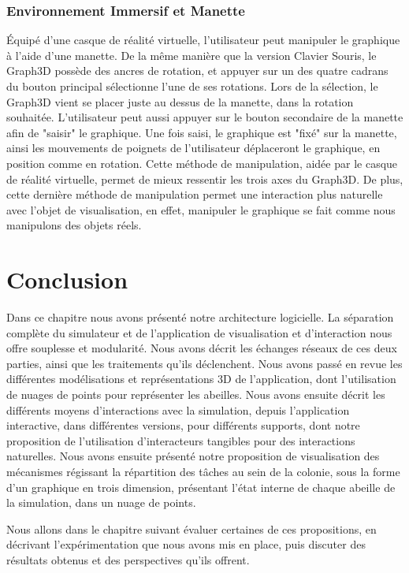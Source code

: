 		\subsubsection{Environnement Immersif et Manette}
		Équipé d'une casque de réalité virtuelle, l'utilisateur peut manipuler le graphique à l'aide d'une manette. De la même manière que la version Clavier Souris, le Graph3D possède des ancres de rotation, et appuyer sur un des quatre cadrans du bouton principal sélectionne l'une de ses rotations. Lors de la sélection, le Graph3D vient se placer juste au dessus de la manette, dans la rotation souhaitée. L'utilisateur peut aussi appuyer sur le bouton secondaire de la manette afin de "saisir" le graphique. Une fois saisi, le graphique est "fixé" sur la manette, ainsi les mouvements de poignets de l'utilisateur déplaceront le graphique, en position comme en rotation. Cette méthode de manipulation, aidée par le casque de réalité virtuelle, permet de mieux ressentir les trois axes du Graph3D. De plus, cette dernière méthode de manipulation permet une interaction plus naturelle avec l'objet de visualisation, en effet, manipuler le graphique se fait comme nous manipulons des objets réels.
		
	
	
			
	\section*{Conclusion}
	Dans ce chapitre nous avons présenté notre architecture logicielle. La séparation complète du simulateur et de l'application de visualisation et d'interaction nous offre souplesse et modularité. Nous avons décrit les échanges réseaux de ces deux parties, ainsi que les traitements qu'ils déclenchent. Nous avons passé en revue les différentes modélisations et représentations 3D de l'application, dont l'utilisation de nuages de points pour représenter les abeilles. Nous avons ensuite décrit les différents moyens d'interactions avec la simulation, depuis l'application interactive, dans différentes versions, pour différents supports, dont notre proposition de l'utilisation d'interacteurs tangibles pour des interactions naturelles.
	Nous avons ensuite présenté notre proposition de visualisation des mécanismes régissant la répartition des tâches au sein de la colonie, sous la forme d'un graphique en trois dimension, présentant l'état interne de chaque abeille de la simulation, dans un nuage de points.
	
	 Nous allons dans le chapitre suivant évaluer certaines de ces propositions, en décrivant l'expérimentation que nous avons mis en place, puis discuter des résultats obtenus et des perspectives qu'ils offrent.
	
